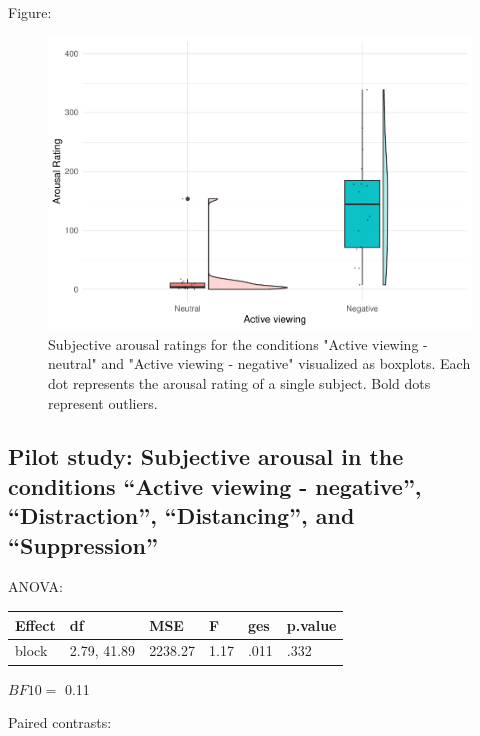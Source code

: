 \documentclass[
  man,floatsintext]{apa6}
\begin{document}
Figure:

\begin{figure}[H]
\includegraphics[width=0.75\linewidth]{Manuscript_ERED_Stage2_files/figure-latex/FigSubjArousalViewPilot-1} \caption{Subjective arousal ratings for the conditions "Active viewing - neutral" and "Active viewing - negative" visualized as boxplots. Each dot represents the arousal rating of a single subject. Bold dots represent outliers.}\label{fig:FigSubjArousalViewPilot}
\end{figure}

\hypertarget{pilot-study-subjective-arousal-in-the-conditions-active-viewing---negative-distraction-distancing-and-suppression}{%
\subsection{Pilot study: Subjective arousal in the conditions ``Active viewing - negative'', ``Distraction'', ``Distancing'', and ``Suppression''}\label{pilot-study-subjective-arousal-in-the-conditions-active-viewing---negative-distraction-distancing-and-suppression}}

ANOVA:

\begin{tabular}{l|l|l|l|l|l}
\hline
Effect & df & MSE & F & ges & p.value\\
\hline
block & 2.79, 41.89 & 2238.27 & 1.17 & .011 & .332\\
\hline
\end{tabular}

\(BF10=\) 0.11

Paired contrasts:
\end{document}
